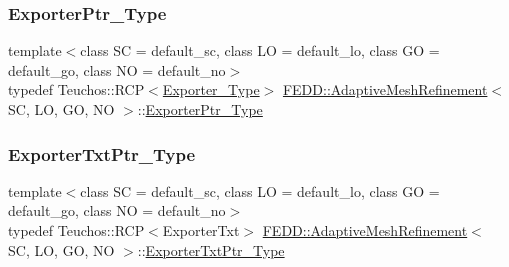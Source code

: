 \mbox{\label{classFEDD_1_1AdaptiveMeshRefinement_ac8cda8533e68f9049ede0208be2175d6}} 
\subsubsection{\texorpdfstring{Exporter\+Ptr\+\_\+\+Type}{ExporterPtr\_Type}}
{\footnotesize\ttfamily template$<$class SC = default\+\_\+sc, class LO = default\+\_\+lo, class GO = default\+\_\+go, class NO = default\+\_\+no$>$ \\
typedef Teuchos\+::\+R\+CP$<$\hyperlink{classFEDD_1_1AdaptiveMeshRefinement_a3f493149d664db5c1024f27f87f0ac15}{Exporter\+\_\+\+Type}$>$ \hyperlink{classFEDD_1_1AdaptiveMeshRefinement}{F\+E\+D\+D\+::\+Adaptive\+Mesh\+Refinement}$<$ SC, LO, GO, NO $>$\+::\hyperlink{classFEDD_1_1AdaptiveMeshRefinement_ac8cda8533e68f9049ede0208be2175d6}{Exporter\+Ptr\+\_\+\+Type}}

\mbox{\label{classFEDD_1_1AdaptiveMeshRefinement_afc81b6919eb7756e16e696631e0d666b}} 
\subsubsection{\texorpdfstring{Exporter\+Txt\+Ptr\+\_\+\+Type}{ExporterTxtPtr\_Type}}
{\footnotesize\ttfamily template$<$class SC = default\+\_\+sc, class LO = default\+\_\+lo, class GO = default\+\_\+go, class NO = default\+\_\+no$>$ \\
typedef Teuchos\+::\+R\+CP$<$Exporter\+Txt$>$ \hyperlink{classFEDD_1_1AdaptiveMeshRefinement}{F\+E\+D\+D\+::\+Adaptive\+Mesh\+Refinement}$<$ SC, LO, GO, NO $>$\+::\hyperlink{classFEDD_1_1AdaptiveMeshRefinement_afc81b6919eb7756e16e696631e0d666b}{Exporter\+Txt\+Ptr\+\_\+\+Type}}

\mbox{\label{classFEDD_1_1AdaptiveMeshRefinement_af60419a5ef8a4785991b704d1ad7aacb}} 

